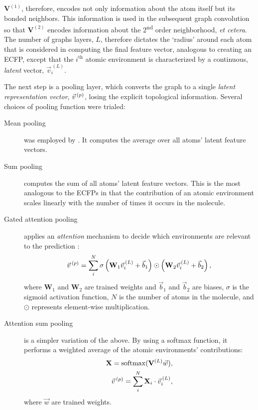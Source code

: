 $\mathbf{V}^{(1)}$, therefore, encodes not only information about the atom
itself but its bonded neighbors. This information is used in the subsequent
graph convolution so that $\mathbf{V}^{(2)}$ encodes information about the
2\textsuperscript{nd} order neighborhood, \emph{et cetera}. The number of graphs
layers, $L$, therefore dictates the `radius' around each atom that is considered
in computing the final feature vector, analogous to creating an ECFP, except
that the $i^\text{th}$ atomic environment is characterized by a continuous,
\emph{latent} vector, $\vec{v}^{\,(L)}_i$.

The next step is a pooling layer, which converts the graph to a single
\emph{latent representation vector}, $\vec{v}^{\,(p)}{}$, losing the explicit topological
information. Several choices of pooling function were trialed:

\begin{description}
    \item[Mean pooling] was employed by \citet{qinPredictingCriticalMicelle2021}. It computes the average
          over all atoms' latent feature vectors.
    \item[Sum pooling] computes the sum of all atoms' latent feature vectors.
          This is the most analogous to the ECFPs in that the contribution of an atomic environment scales linearly with the number of times it occurs
          in the molecule.
    \item[Gated attention pooling] applies an \emph{attention} mechanism to decide which environments
          are relevant to the prediction \cite{liGatedGraphSequence2017}:
          \begin{equation}
              \vec{v}^{\,(p)}{} = \sum_i^N \sigma\left(\mathbf{W}_1 \vec{v}_i^{\,(L)} + \vec{b}_1 \right) \odot \left(\mathbf{W}_2 \vec{v}_i^{\,(L)} + \vec{b}_2 \right),
          \end{equation}
          where $\mathbf{W}_1$ and $\mathbf{W}_2$ are trained weights and
          $\vec{b}_1$ and $\vec{b}_2$ are biases, $\sigma$ is the sigmoid
          activation function, $N$ is the number of atoms in the molecule, and
          $\odot$ represents element-wise multiplication.
    \item[Attention sum pooling] is a simpler variation of the above. By using a
          softmax function, it performs a weighted average of the atomic environments'
          contributions:
          \begin{align}
              \mathbf{X} = \mathrm{softmax}(\mathbf{V}^{(L)}\vec{w}), \\
              \vec{v}^{\,(p)}{} = \sum_i^N \mathbf{X}_i \cdot \vec{v}^{\,(L)}_i,
          \end{align}
          where $\vec{w}$ are trained weights.
\end{description}

